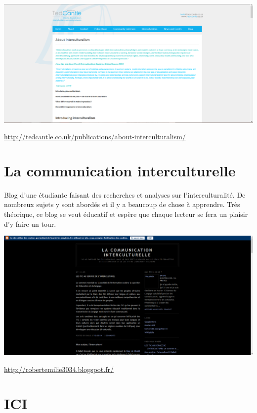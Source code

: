 \begin{center}
	\includegraphics[scale=0.25]{interculturality.png}
\end{center}
\url{http://tedcantle.co.uk/publications/about-interculturalism/}

\section{La communication interculturelle}

\paragraph{} Blog d'une étudiante faisant des recherches et analyses sur
l'interculturalité. De nombreux sujets y sont abordés et il y a beaucoup de
chose à apprendre. Très théorique, ce blog se veut éducatif et espère que
chaque lecteur se fera un plaisir d'y faire un tour.

\begin{center}
	\includegraphics[scale=0.25]{ComInter.png}
\end{center}
\url{http://robertemilie3034.blogspot.fr/}

\section{ICI}

